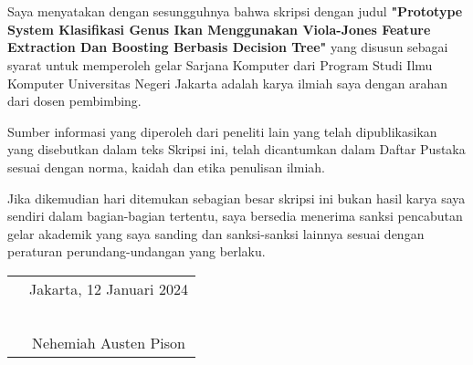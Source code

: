 \chapter*{}
\onehalfspacing{}

Saya menyatakan dengan sesungguhnya bahwa skripsi dengan judul
\textbf{"Prototype System Klasifikasi Genus Ikan Menggunakan Viola-Jones Feature Extraction Dan Boosting Berbasis Decision Tree"} yang disusun sebagai syarat untuk memperoleh gelar Sarjana Komputer
dari Program Studi Ilmu Komputer Universitas Negeri Jakarta adalah karya ilmiah
saya dengan arahan dari dosen pembimbing.

Sumber informasi yang diperoleh dari peneliti lain yang telah dipublikasikan 
yang disebutkan dalam teks Skripsi ini, telah dicantumkan dalam Daftar Pustaka 
sesuai dengan norma, kaidah dan etika penulisan ilmiah.

Jika dikemudian hari ditemukan sebagian besar skripsi ini bukan hasil karya saya 
sendiri dalam bagian-bagian tertentu, saya bersedia menerima sanksi pencabutan 
gelar akademik yang saya sanding dan sanksi-sanksi lainnya sesuai dengan 
peraturan perundang-undangan yang berlaku.

\vspace{4cm}

\begin{tabular}{p{7.5cm}c}
	&Jakarta, 12 Januari 2024\\
	&\\
	&\\
	&\\
	&\\
	&\\
	&Nehemiah Austen Pison
\end{tabular}
